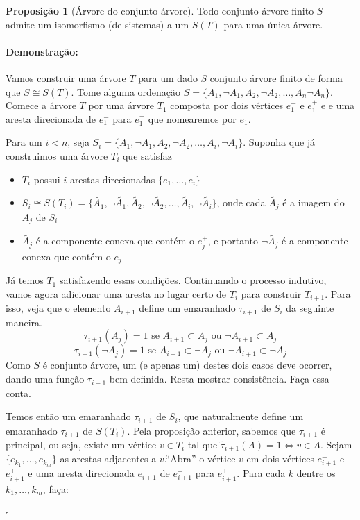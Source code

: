 \documentclass[11pt]{article}
\newcommand{\pulinho}{\vspace{.5cm}}
\theoremstyle{definition}
\theoremstyle{definition}
\theoremstyle{definition}
\newtheorem{prop}{Proposição}
\newenvironment{proposicao}{
\definecolor{shadecolor}{HTML}{FFDBDF}
\begin{shaded}
\begin{prop}
}
{
\end{prop}
\end{shaded}
}
\theoremstyle{definition}
\theoremstyle{definition}
\theoremstyle{definition}
\theoremstyle{definition}
\theoremstyle{definition}
\theoremstyle{definition}
\theoremstyle{definition}
\theoremstyle{definition}
\theoremstyle{definition}
\newenvironment{prova}{\paragraph{Demonstração:}}{\hfill$\square$ 
\pulinho
}
\theoremstyle{definition}
\theoremstyle{definition}
\begin{document}
\begin{proposicao}[Árvore do conjunto árvore]
 Todo conjunto árvore finito $S$ admite um isomorfismo (de sistemas) a um $S(T)$ para uma única árvore.
\end{proposicao}
\begin{prova}
Vamos construir uma árvore $T$ para um dado $S$ conjunto árvore finito de forma que $S \cong S(T)$. Tome alguma ordenação $S = \{A_1,\lnot A_1, A_2, \lnot A_2, \dots, A_n \lnot A_n\}$. Comece a árvore $T$ por uma árvore $T_1$ composta por dois vértices $e_1^-$ e $e_1^+$ e e uma aresta direcionada de $e_1^-$ para $e_1^+$ que nomearemos por $e_1$.

Para um $i < n$, seja $S_i = \{A_1,\lnot A_1, A_2, \lnot A_2, \dots, A_i, \lnot A_i\}$. Suponha que já construimos uma árvore $T_i$ que satisfaz

\begin{itemize}[label=]
  \item $T_i$ possui $i$ arestas direcionadas $\{e_1, \dots, e_i\}$
  \item $S_i \cong S(T_i) = \{\tilde{A_1},\lnot \tilde{A_1}, \tilde{A_2}, \lnot \tilde{A_2}, \dots, \tilde{A_i}, \lnot \tilde{A_i}\}$, onde cada $\tilde{A_j}$ é a imagem do $A_j$ de $S_i$
  \item $\tilde{A_j}$ é a componente conexa que contém o $e_j^+$, e portanto $\lnot \tilde{A_j}$ é a componente conexa que contém o $e_j^-$
\end{itemize}  

Já temos $T_1$ satisfazendo essas condições. Continuando o processo indutivo, vamos agora adicionar uma aresta no lugar certo de $T_i$ para construir $T_{i+1}$. Para isso, veja que o elemento $A_{i+1}$ define um emaranhado $\tau_{i+1}$ de $S_i$ da seguinte maneira.
\[ \tau_{i+1}(A_j) = 1 \text{ se } A_{i+1} \subset A_j \text{ ou } \lnot A_{i+1} \subset A_j \]
\[ \tau_{i+1}(\lnot A_j) = 1 \text{ se }  A_{i+1} \subset \lnot A_j \text{ ou } \lnot A_{i+1} \subset \lnot A_{j} \]
Como $S$ é conjunto árvore, um (e apenas um) destes dois casos deve ocorrer, dando uma função $\tau_{i+1}$ bem definida. Resta mostrar consistência. Faça essa conta.

Temos então um emaranhado $\tau_{i+1}$ de $S_i$, que naturalmente define um emaranhado $\tilde{\tau}_{i+1}$ de $S(T_i)$. Pela proposição anterior, sabemos que $\tau_{i+1}$ é principal, ou seja, existe um vértice $v \in T_i$ tal que $\tilde{\tau}_{i+1}(A) = 1 \Leftrightarrow v \in A$. Sejam $\{e_{k_1}, \dots, e_{k_m}\}$ as arestas adjacentes a $v$.``Abra'' o vértice $v$ em dois vértices $e_{i+1}^-$ e $e_{i+1}^+$ e uma aresta direcionada $e_{i+1}$ de $e_{i+1}^-$ para $e_{i+1}^+$. Para cada $k$ dentre os $k_1,\dots, k_m$, faça: 


\end{prova}
\end{document}
